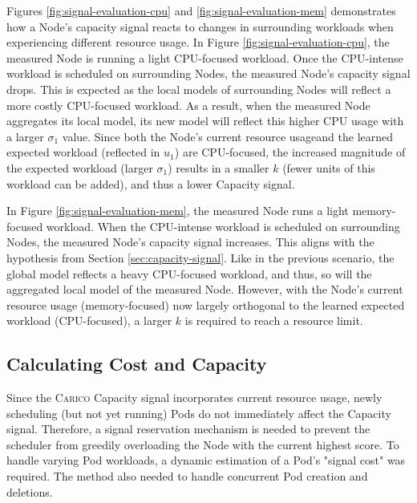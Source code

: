 Figures \ref{fig:signal-evaluation-cpu} and \ref{fig:signal-evaluation-mem}
demonstrates how a Node's capacity signal reacts to changes in surrounding
workloads when experiencing different resource usage. In Figure
\ref{fig:signal-evaluation-cpu}, the measured Node is running a light CPU-focused
workload. Once the CPU-intense workload is scheduled on surrounding Nodes, the
measured Node's capacity signal drops. This is expected as the local models of
surrounding Nodes will reflect a more costly CPU-focused workload. As a result,
when the measured Node aggregates its local model, its new model will reflect
this higher CPU usage with a larger $\sigma_1$ value. Since both the Node's
current resource usageand the learned expected workload (reflected in $u_1$) are
CPU-focused, the increased magnitude of the expected workload (larger
$\sigma_1$) results in a smaller $k$ (fewer units of this workload can be
added), and thus a lower Capacity signal.

In Figure \ref{fig:signal-evaluation-mem}, the measured Node runs a light
memory-focused workload. When the CPU-intense workload is scheduled on surrounding
Nodes, the measured Node's capacity signal increases. This aligns with the
hypothesis from Section \ref{sec:capacity-signal}. Like in the previous scenario, the global model
reflects a heavy CPU-focused workload, and thus, so will the aggregated local
model of the measured Node. However, with the Node's current resource usage
(memory-focused) now largely orthogonal to the learned expected workload
(CPU-focused), a larger $k$ is required to reach a resource limit.

\subsection{Calculating Cost and Capacity}
Since the \textsc{Carico} Capacity signal incorporates current resource usage,
newly scheduling (but not yet running) Pods do not immediately affect the
Capacity signal. Therefore, a signal reservation mechanism is needed to prevent
the scheduler from greedily overloading the Node with the current highest score.
To handle varying Pod workloads, a dynamic estimation of a Pod's "signal cost"
was required. The method also needed to handle concurrent Pod creation and
deletions.

